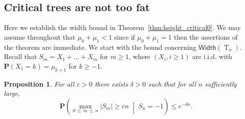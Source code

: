 \documentclass[10pt]{amsart}
\newtheorem{prop}[theo]{Proposition}
\theoremstyle{definition}
\numberwithin{figure}{section}
\newcommand{\p}{\mathbf{P}}
\newcommand{\Width}{\mathsf{Width}}
\DeclareMathOperator{\rtree}{T}
\newcommand{\set}[1]{\left(#1 \right)}
\newcommand{\Cprob}[2]{\mathbf{P}\set{\left. #1 \; \middle| \; #2\right.}}
\providecommand{\eps}{}
\renewcommand{\eps}{\varepsilon}
\begin{document}
\subsection{Critical trees are not too fat} Here we establish the width bound in Theorem~\ref{thm:height_critical0}. We may assume throughout that $\mu_0+\mu_1<1$ since if $\mu_0+\mu_1=1$ then the assertions of the theorem are immediate. We start with the bound concerning $\Width(\rtree_{n})$. Recall that $S_m=X_1+\ldots+X_m$ for $m \ge 1$, where $(X_i,i \ge 1)$ are i.i.d. with $\p(X_1=k)=\mu_{k+1}$ for $k \ge -1$.

\begin{prop}\label{prop:width_bound}
For all $\eps > 0$ there exists $\delta > 0$ such that for all $n$ sufficiently large,
\[
\Cprob{\max_{0\,\le\,m\,\le\,n} |S_m| \ge \eps n}{S_n=-1} \le e^{-\delta n}.
\]
\end{prop}
\end{document}
